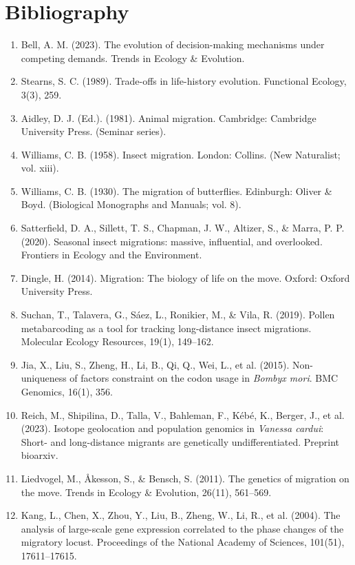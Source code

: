 \documentclass[lineno]{wiley-article}
\begin{document}
\section*{Bibliography}
\begin{enumerate}
\item Bell, A. M. (2023). The evolution of decision-making mechanisms under competing demands. Trends in Ecology \& Evolution.
\item Stearns, S. C. (1989). Trade-offs in life-history evolution. Functional Ecology, 3(3), 259.
\item Aidley, D. J. (Ed.). (1981). Animal migration. Cambridge: Cambridge University Press. (Seminar series).
\item Williams, C. B. (1958). Insect migration. London: Collins. (New Naturalist; vol. xiii).
\item Williams, C. B. (1930). The migration of butterflies. Edinburgh: Oliver \& Boyd. (Biological Monographs and Manuals; vol. 8).
\item Satterfield, D. A., Sillett, T. S., Chapman, J. W., Altizer, S., \& Marra, P. P. (2020). Seasonal insect migrations: massive, influential, and overlooked. Frontiers in Ecology and the Environment.
\item Dingle, H. (2014). Migration: The biology of life on the move. Oxford: Oxford University Press.

\item Suchan, T., Talavera, G., Sáez, L., Ronikier, M., \& Vila, R. (2019). Pollen metabarcoding as a tool for tracking long-distance insect migrations. Molecular Ecology Resources, 19(1), 149–162.

\item Jia, X., Liu, S., Zheng, H., Li, B., Qi, Q., Wei, L., et al. (2015). Non-uniqueness of factors constraint on the codon usage in \textit{Bombyx mori}. BMC Genomics, 16(1), 356.

\item Reich, M., Shipilina, D., Talla, V., Bahleman, F., Kébé, K., Berger, J., et al. (2023). Isotope geolocation and population genomics in \textit{Vanessa cardui}: Short- and long-distance migrants are genetically undifferentiated. Preprint bioarxiv.

\item Liedvogel, M., Åkesson, S., \& Bensch, S. (2011). The genetics of migration on the move. Trends in Ecology \& Evolution, 26(11), 561–569.

\item Kang, L., Chen, X., Zhou, Y., Liu, B., Zheng, W., Li, R., et al. (2004). The analysis of large-scale gene expression correlated to the phase changes of the migratory locust. Proceedings of the National Academy of Sciences, 101(51), 17611–17615.


\end{enumerate}
\end{document}
